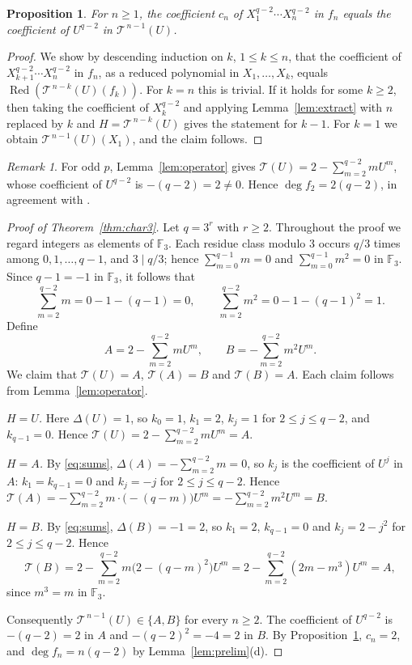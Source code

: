 \documentclass[11pt]{amsart}
\newtheorem{proposition}[theorem]{Proposition}
\theoremstyle{definition}
\theoremstyle{remark}
\newtheorem{remark}[theorem]{Remark}
\newcommand{\F}{\mathbb{F}}
\newcommand{\Red}{\operatorname{Red}}
\newcommand{\cT}{\mathcal{T}}
\begin{document}
\begin{proposition}\label{prop:coefficient}
For $n\ge1$, the coefficient $c_n$ of $X_1^{q-2}\cdots X_n^{q-2}$ in $f_n$ equals the coefficient of $U^{q-2}$ in $\cT^{\,n-1}(U)$.
\end{proposition}

\begin{proof}
We show by descending induction on $k$, $1\le k\le n$, that the coefficient of $X_{k+1}^{q-2}\cdots X_n^{q-2}$ in $f_n$, as a reduced polynomial in $X_1,\dots,X_k$, equals $\Red(\cT^{\,n-k}(U)(f_k))$. For $k=n$ this is trivial. If it holds for some $k\ge2$, then taking the coefficient of $X_k^{q-2}$ and applying Lemma~\ref{lem:extract} with $n$ replaced by $k$ and $H=\cT^{\,n-k}(U)$ gives the statement for $k-1$. For $k=1$ we obtain $\cT^{\,n-1}(U)(X_1)$, and the claim follows.
\end{proof}

\begin{remark}
For odd $p$, Lemma~\ref{lem:operator} gives $\cT(U)=2-\sum_{m=2}^{q-2}mU^m$, whose coefficient of $U^{q-2}$ is $-(q-2)=2\ne0$. Hence $\deg f_2=2(q-2)$, in agreement with \cite[Theorem~7]{GU25a}.
\end{remark}

\begin{proof}[Proof of Theorem~\ref{thm:char3}]
Let $q=3^r$ with $r\ge2$. Throughout the proof we regard integers as elements of $\F_3$. Each residue class modulo $3$ occurs $q/3$ times among $0,1,\dots,q-1$, and $3\mid q/3$; hence $\sum_{m=0}^{q-1}m=0$ and $\sum_{m=0}^{q-1}m^2=0$ in $\F_3$. Since $q-1=-1$ in $\F_3$, it follows that
\begin{equation}\label{eq:sums}
\sum_{m=2}^{q-2}m=0-1-(q-1)=0,\qquad\sum_{m=2}^{q-2}m^2=0-1-(q-1)^2=1.
\end{equation}
Define
\[
A=2-\sum_{m=2}^{q-2}mU^m,\qquad B=-\sum_{m=2}^{q-2}m^2U^m.
\]
We claim that $\cT(U)=A$, $\cT(A)=B$ and $\cT(B)=A$. Each claim follows from Lemma~\ref{lem:operator}.

\emph{$H=U$.} Here $\Delta(U)=1$, so $k_0=1$, $k_1=2$, $k_j=1$ for $2\le j\le q-2$, and $k_{q-1}=0$. Hence $\cT(U)=2-\sum_{m=2}^{q-2}mU^m=A$.

\emph{$H=A$.} By \eqref{eq:sums}, $\Delta(A)=-\sum_{m=2}^{q-2}m=0$, so $k_j$ is the coefficient of $U^j$ in $A$: $k_1=k_{q-1}=0$ and $k_j=-j$ for $2\le j\le q-2$. Hence $\cT(A)=-\sum_{m=2}^{q-2}m\cdot\bigl(-(q-m)\bigr)U^m=-\sum_{m=2}^{q-2}m^2U^m=B$.

\emph{$H=B$.} By \eqref{eq:sums}, $\Delta(B)=-1=2$, so $k_1=2$, $k_{q-1}=0$ and $k_j=2-j^2$ for $2\le j\le q-2$. Hence
\[
\cT(B)=2-\sum_{m=2}^{q-2}m\bigl(2-(q-m)^2\bigr)U^m=2-\sum_{m=2}^{q-2}(2m-m^3)U^m=A,
\]
since $m^3=m$ in $\F_3$.

Consequently $\cT^{\,n-1}(U)\in\{A,B\}$ for every $n\ge2$. The coefficient of $U^{q-2}$ is $-(q-2)=2$ in $A$ and $-(q-2)^2=-4=2$ in $B$. By Proposition~\ref{prop:coefficient}, $c_n=2$, and $\deg f_n=n(q-2)$ by Lemma~\ref{lem:prelim}(d).
\end{proof}
\end{document}
